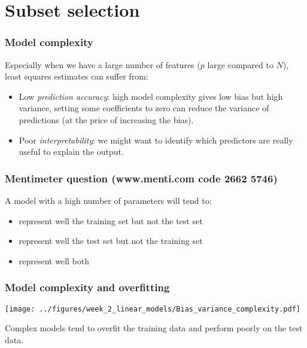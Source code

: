 \documentclass[notes]{beamer}          %
\begin{document}
\section{Subset selection}

\begin{frame}
\frametitle{Model complexity}

Especially when we have a large number of features ($p$ large compared to $N$), least squares estimates can suffer from:

\begin{itemize}
    \item Low \textit{prediction accuracy}: high model complexity gives low bias but high variance, setting some coefficients to zero can reduce the variance of predictions (at the price of increasing the bias).
    \item Poor \textit{interpretability}: we might want to identify which predictors are really useful to explain the output.
\end{itemize}

\end{frame}


\begin{frame}
\frametitle{Mentimeter question (www.menti.com code 2662 5746)}

A model with a high number of parameters will tend to:
\begin{itemize}
    \item represent well the training set but not the test set
    \item represent well the test set but not the training set
    \item represent well both
\end{itemize}
\end{frame}


\begin{frame}
\frametitle{Model complexity and overfitting}

\begin{center}
\texttt{[image: ../figures/week\_2\_linear\_models/Bias\_variance\_complexity.pdf]}
\end{center}

Complex models tend to overfit the training data and perform poorly on the test data.

\end{frame}
\end{document}
